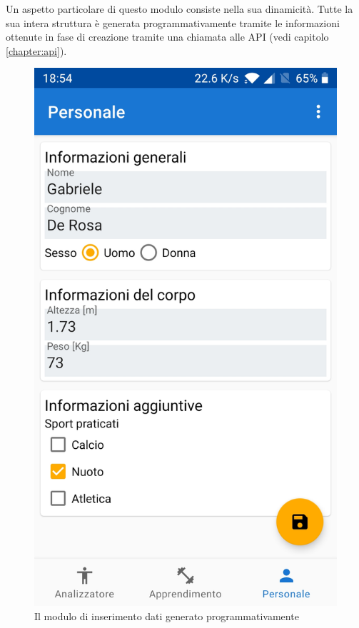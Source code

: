 Un aspetto particolare di questo modulo consiste nella sua dinamicità. Tutte la sua intera struttura è generata programmativamente 
tramite le informazioni ottenute in fase di creazione tramite una chiamata alle API (vedi capitolo \ref{chapter:api}).

\begin{figure}[H]
    \centering
    \includegraphics[scale = 0.10]{assets/images/screenshots/3a_Init.jpg}    
    \caption{Il modulo di inserimento dati generato programmativamente}
    \label{fig:screenshots_personal}
\end{figure}


